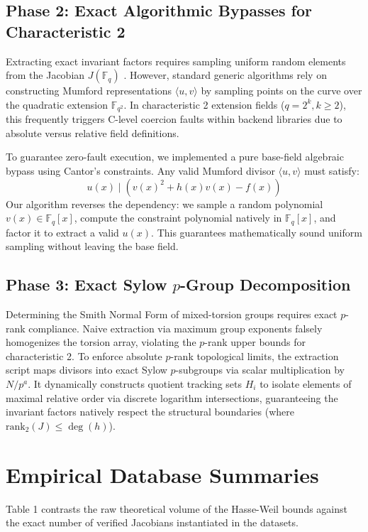 \documentclass[letterpaper, 11pt]{article}
\begin{document}
\subsection{Phase 2: Exact Algorithmic Bypasses for Characteristic 2}
Extracting exact invariant factors requires sampling uniform random elements from the Jacobian $J(\mathbb{F}_q)$ \cite{Sutherland2007}. However, standard generic algorithms rely on constructing Mumford representations $\langle u, v \rangle$ \cite{Cantor1987} by sampling points on the curve over the quadratic extension $\mathbb{F}_{q^2}$. In characteristic 2 extension fields ($q = 2^k, k \ge 2$), this frequently triggers C-level coercion faults within backend libraries due to absolute versus relative field definitions.

To guarantee zero-fault execution, we implemented a pure base-field algebraic bypass using Cantor's constraints. Any valid Mumford divisor $\langle u, v \rangle$ must satisfy:
\begin{equation}
    u(x) \mid \left( v(x)^2 + h(x)v(x) - f(x) \right)
\end{equation}
Our algorithm reverses the dependency: we sample a random polynomial $v(x) \in \mathbb{F}_q[x]$, compute the constraint polynomial natively in $\mathbb{F}_q[x]$, and factor it to extract a valid $u(x)$. This guarantees mathematically sound uniform sampling without leaving the base field.

\subsection{Phase 3: Exact Sylow \texorpdfstring{$p$}{p}-Group Decomposition}
Determining the Smith Normal Form of mixed-torsion groups requires exact $p$-rank compliance. Naive extraction via maximum group exponents falsely homogenizes the torsion array, violating the $p$-rank upper bounds for characteristic 2. To enforce absolute $p$-rank topological limits, the extraction script maps divisors into exact Sylow $p$-subgroups via scalar multiplication by $N/p^a$. It dynamically constructs quotient tracking sets $H_i$ to isolate elements of maximal relative order via discrete logarithm intersections, guaranteeing the invariant factors natively respect the structural boundaries (where $\text{rank}_2(J) \le \deg(h)$). 

\section{Empirical Database Summaries}
Table 1 contrasts the raw theoretical volume of the Hasse-Weil bounds against the exact number of verified Jacobians instantiated in the datasets.
\end{document}
